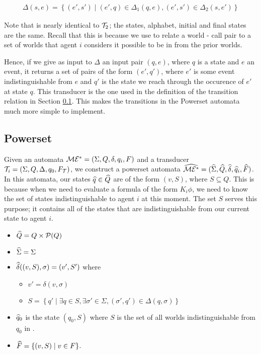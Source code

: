 \documentclass[10pt, a4paper]{report}
\begin{document}
\begin{align*}
  \Delta(s, e) = \left\{ (e', s') \mid (e', q) \in \Delta_1(q, e), (e', s') \in \Delta_2(s, e') \right\} 
\end{align*}

Note that  is nearly identical to $\mathcal{T}_2$; the states, alphabet,
initial and final states are the same. Recall that this is because we use
 to relate a world - call pair to a set of worlds that agent $i$
considers it possible to be in from the prior worlds. 

Hence, if we give as input to $\Delta$ an input pair $(q, e)$, where $q$ is a
state and $e$ an event, it returns a set of pairs of the form $(e', q')$, where
$e'$ is some event indistinguishable from $e$ and $q'$ is the state we reach
through the occurence of $e'$ at state $q$. This transducer is the one used in
the definition of the transition relation in Section \ref{subsubsec:Powerset}.
This makes the transitions in the Powerset automata much more simple to
implement.

\subsection{Powerset}
\label{subsubsec:Powerset}

Given an automata $\mathcal{ME^\ast} = (\Sigma, Q, \delta, q_i, F)$ and a transducer
$\mathcal{T}_i = (\Sigma, Q, \Delta, q_0, F_{\mathcal{T}})$, we construct a powerset
automata $\widehat{\mathcal{ME^\ast}} = (\widehat{\Sigma}, \widehat{Q}, \widehat{\delta}, \widehat{q}_i,
\widehat{F})$. In this automata, our states $\widehat{q} \in \widehat{Q}$ are of the form $(v,
S)$, where $S \subseteq Q$. This is because when we need to evaluate a formula
of the form $K_i\phi$, we need to know the set of states indistinguishable
to agent $i$ at this moment. The set $S$ serves this purpose; it contains all of
the states that are indistinguishable from our current state to agent $i$.

\begin{itemize}
\item $\widehat{Q} = Q \times \mathcal{P}(Q)$
\item $\widehat{\Sigma} = \Sigma$ 
\item $\widehat{\delta}((v, S), \sigma) = (v', S')$ where
  \begin{itemize}
  \item $v' =  \delta(v, \sigma)$
  \item $S = \left\{q' \mid \exists q \in S, \exists \sigma' \in \Sigma,
      (\sigma', q') \in \Delta(q, \sigma) \right\}$
  \end{itemize}
\item $\widehat{q}_0$ is the state $(q_0, S)$ where $S$ is the set of all worlds
  indistinguishable from $q_0$ in \mestar.
\item $\widehat{F} = \left\{ (v, S) \mid v \in F \right\}$.
\end{itemize}
\end{document}
